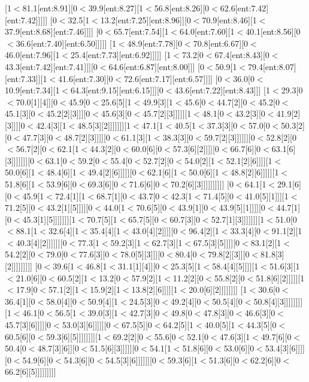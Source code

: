 [1$<$81.1[ent:8.91][0$<$39.9[ent:8.27][1$<$56.8[ent:8.26][0$<$62.6[ent:7.42][ent:7.42]]]]]
[0$<$32.5[1$<$13.2[ent:7.25][ent:8.96]][0$<$70.9[ent:8.46][1$<$37.9[ent:8.68][ent:7.46]]]]
[0$<$65.7[ent:7.54][1$<$64.0[ent:7.60][1$<$40.1[ent:8.56][0$<$36.6[ent:7.40][ent:6.50]]]]]
[1$<$48.9[ent:7.78][0$<$70.8[ent:6.67][0$<$46.0[ent:7.96][1$<$25.4[ent:7.73][ent:6.92]]]]]
[1$<$73.2[0$<$67.4[ent:8.43][0$<$43.3[ent:7.42][ent:7.41]]][0$<$64.6[ent:6.87][ent:8.00]]]
[0$<$50.9[1$<$79.4[ent:8.07][ent:7.33]][1$<$41.6[ent:7.30][0$<$72.6[ent:7.17][ent:6.57]]]]
[0$<$36.0[0$<$10.9[ent:7.34][1$<$64.3[ent:9.15][ent:6.15]]][0$<$43.6[ent:7.22][ent:8.43]]]
[1$<$29.3[0$<$70.0[1][4]][0$<$45.9[0$<$25.6[5][1$<$49.9[3][1$<$45.6[0$<$44.7[2][0$<$45.2[0$<$45.1[3][0$<$45.2[2][3]]][0$<$45.6[3][0$<$45.7[2][3]]]]][1$<$48.1[0$<$43.2[3][0$<$41.9[2][3]]][0$<$42.4[3][1$<$48.5[3][2]]]]]]][1$<$47.1[1$<$40.5[1$<$37.3[3][0$<$57.0[0$<$50.3[2][0$<$47.7[3][0$<$48.7[2][3]]]][0$<$61.1[3][1$<$38.3[3][0$<$59.7[2][3]]]]]][0$<$52.8[2][0$<$56.7[2][0$<$62.1[1$<$44.3[2][0$<$60.0[6][0$<$57.3[6][2]]]][0$<$66.7[6][0$<$63.1[6][3]]]]]]][0$<$63.1[0$<$59.2[0$<$55.4[0$<$52.7[2][0$<$54.0[2][1$<$52.1[2][6]]]][1$<$50.0[6][1$<$48.4[6][1$<$49.4[2][6]]]]][0$<$62.1[6][1$<$50.0[6][1$<$48.8[2][6]]]]][1$<$51.8[6][1$<$53.9[6][0$<$69.3[6][0$<$71.6[6][0$<$70.2[6][3]]]]]]]]]]
[0$<$64.1[1$<$29.1[6][0$<$45.9[1$<$72.4[1][1$<$68.7[1][0$<$43.7[0$<$42.3[1$<$71.4[5][0$<$41.0[5][1]]][1$<$71.2[5][0$<$43.2[1][5]]]][0$<$44.0[1$<$70.6[5][0$<$43.9[1][0$<$43.9[5][1]]]][0$<$44.7[1][0$<$45.3[1][5]]]]]]][1$<$70.7[5][1$<$65.7[5][0$<$60.7[3][0$<$52.7[1][3]]]]]]][1$<$51.0[0$<$88.1[1$<$32.6[4][1$<$35.4[4][1$<$43.0[4][2]]]][0$<$96.4[2][1$<$33.3[4][0$<$91.1[2][1$<$40.3[4][2]]]]]][0$<$77.3[1$<$59.2[3][1$<$62.7[3][1$<$67.5[3][5]]]][0$<$83.1[2][1$<$54.2[2][0$<$79.0[0$<$77.6[3][0$<$78.0[5][3]]][0$<$80.4[0$<$79.8[2][3]][0$<$81.8[3][2]]]]]]]]]
[0$<$39.6[1$<$46.8[1$<$31.1[1][4]][0$<$25.3[5][1$<$58.4[4][5]]]][1$<$51.6[3][1$<$21.0[6][0$<$60.5[2][1$<$13.2[0$<$57.9[2][1$<$11.2[2][0$<$55.8[2][0$<$51.8[6][2]]]]][1$<$17.9[0$<$57.1[2][1$<$15.9[2][1$<$13.8[2][6]]]][1$<$20.0[6][2]]]]]]]]
[1$<$30.6[0$<$36.4[1][0$<$58.0[4][0$<$50.9[4][1$<$24.5[3][0$<$49.2[4][0$<$50.5[4][0$<$50.8[4][3]]]]]]]][1$<$46.1[0$<$56.5[1$<$39.0[3][1$<$42.7[3][0$<$49.8[0$<$47.8[3][0$<$46.6[3][0$<$45.7[3][6]]]][0$<$53.0[3][6]]]]][0$<$67.5[5][0$<$64.2[5][1$<$40.0[5][1$<$44.3[5][0$<$60.5[6][0$<$59.3[6][5]]]]]]]][1$<$69.2[2][0$<$55.6[0$<$52.1[0$<$47.6[3][1$<$49.7[6][0$<$50.4[0$<$48.7[3][6]][0$<$51.5[6][3]]]]][0$<$54.1[1$<$51.8[6][0$<$53.0[6][0$<$53.4[3][6]]]][0$<$54.9[6][0$<$54.3[6][0$<$54.5[3][6]]]]]][0$<$59.3[6][1$<$51.3[6][0$<$62.2[6][0$<$66.2[6][5]]]]]]]]]
